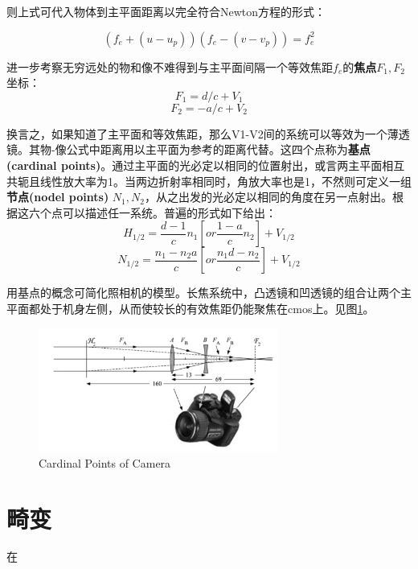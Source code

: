 \documentclass[12pt]{ctexart}%
\begin{document}
则上式可代入物体到主平面距离以完全符合Newton方程的形式：
\begin{framed}
    \begin{equation}
        (f_e+(u-u_p))(f_e-(v-v_p))=f_{e}^2
    \end{equation}
\end{framed}
\noindent 进一步考察无穷远处的物和像不难得到与主平面间隔一个等效焦距$f_e$的\textbf{焦点}$F_1,F_2$坐标：
\begin{equation}
    F_1=d/c+V_1
\end{equation}
\begin{equation}
    F_2=-a/c+V_2
\end{equation}
\par 换言之，如果知道了主平面和等效焦距，那么V1-V2间的系统可以等效为一个薄透镜。其物-像公式中距离用以主平面为参考的距离代替。这四个点称为\textbf{基点(cardinal points)}。通过主平面的光必定以相同的位置射出，或言两主平面相互共轭且线性放大率为1。当两边折射率相同时，角放大率也是1，不然则可定义一组\textbf{节点(nodel points)} $N_1,N_2$，从之出发的光必定以相同的角度在另一点射出。根据这六个点可以描述任一系统。普遍的形式如下给出：
\begin{equation}
    {H}_{1/2}=\frac{d-1}{c}n_1[or \frac{1-a}{c}n_2]+V_{1/2}
\end{equation}
\begin{equation}
    {N}_{1/2}=\frac{n_1-n_2a}{c}[or \frac{n_1d-n_2}{c}]+V_{1/2}
\end{equation}
\par 用基点的概念可简化照相机的模型。长焦系统中，凸透镜和凹透镜的组合让两个主平面都处于机身左侧，从而使较长的有效焦距仍能聚焦在cmos上。见图\ref{camera}。
\begin{figure}[t] %
    \centering
    \includegraphics[width=0.7\textwidth]{Image/2_Camera.png}
    \caption{Cardinal Points of Camera}
    \label{camera}
\end{figure}
\section*{畸变}
在
\end{document}

